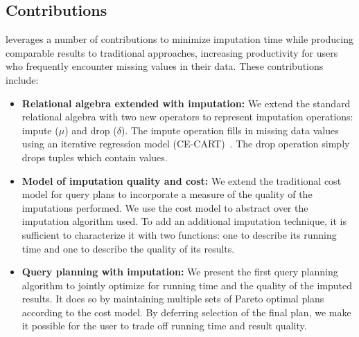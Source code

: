 \subsection{Contributions}
\ProjectName{} leverages a number of contributions to minimize imputation time while producing comparable results to traditional approaches,
increasing productivity for users who frequently encounter missing values in their data. These contributions include:
\begin{itemize}
\item \textbf{Relational algebra extended with imputation:}
  We extend the standard relational algebra with two new operators to represent imputation operations: impute ($\mu$) and drop ($\delta$).
  The impute operation fills in missing data values using an iterative regression model (CE-CART)~\cite{burgette2010multiple}.
  The drop operation simply drops tuples which contain \nullv{} values.
\item \textbf{Model of imputation quality and cost:}
  We extend the traditional cost model for query plans to incorporate a measure of the quality of the imputations performed.
  We use the cost model to abstract over the imputation algorithm used.
  To add an additional imputation technique, it is sufficient to characterize it with two functions: one to describe its running time and one to describe the quality of its results.
\item \textbf{Query planning with imputation:}
  We present the first query planning algorithm to jointly optimize for running time and the quality of the imputed results.
  It does so by maintaining multiple sets of Pareto optimal plans according to the cost model.
  By deferring selection of the final plan, we make it possible for the user to trade off running time and result quality.
\end{itemize}




